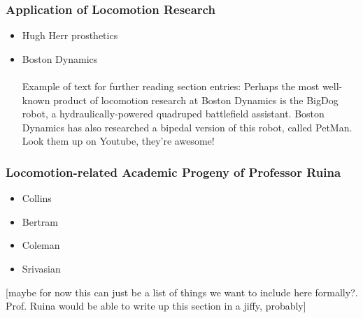 \subsubsection*{Application of Locomotion Research}
\begin{itemize}
\item Hugh Herr prosthetics
\item Boston Dynamics \\ \\Example of text for further reading section entries: Perhaps the most well-known product of locomotion research at Boston Dynamics is the BigDog robot, a hydraulically-powered quadruped battlefield assistant. Boston Dynamics has also researched a bipedal version of this robot, called PetMan. Look them up on Youtube, they're awesome!
\end{itemize}

\subsubsection*{Locomotion-related Academic Progeny of Professor Ruina}
\begin{itemize}
\item Collins
\item Bertram
\item Coleman
\item Srivasian
\end{itemize}

[maybe for now this can just be a list of things we want to include here formally?. Prof. Ruina would be able to write up this section in a jiffy, probably]